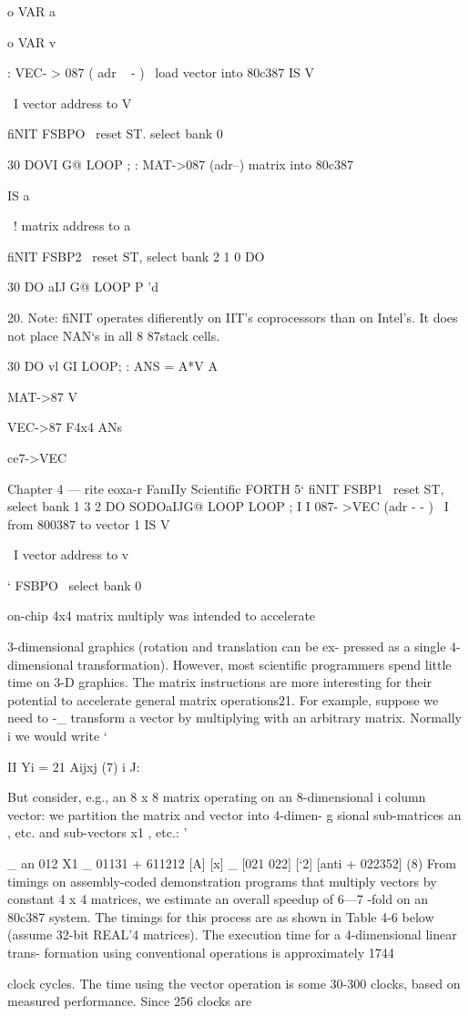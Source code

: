 {{{{{o VAR a{{ o VAR v{

: VEC- > 087 ( adr ~ - ) \ load vector into 80c387
IS V{ \ I vector address to V{
fiNIT FSBPO \ reset ST. select bank 0

30 DOV{I} G@ LOOP ;
: MAT->087 (adr--) \Ioad matrix into 80c387

IS a{{ \ ! matrix address to a{{
fiNIT FSBP2 \ reset ST, select bank 2
1 0 DO

30 DO a{{IJ}} G@ LOOP
P \cont'd

 

20. Note: fiNIT operates difierently on IIT’s coprocessors than on Intel’s. It does not place NAN‘s
in all 8 87stack cells.

30 DO v{l} GI LOOP;
\example: ANS = A*V
A{{ MAT->87 V{ VEC->87 F4x4 ANs{ce7->VEC

Chapter 4 — rite eoxa-r FamIIy Scientific FORTH 5‘
fiNIT FSBP1 \ reset ST, select bank 1
3 2 DO
SODOa{{IJ}}G@ LOOP
LOOP ; I
I
087- >VEC (adr - - ) \ I from 800387 to vector 1
IS V{ \ I vector address to v{ ‘
FSBPO \ select bank 0 %

 

 on-chip 4x4 matrix multiply was intended to accelerate

3-dimensional graphics (rotation and translation can be ex-
pressed as a single 4-dimensional transformation). However, most
scientific programmers spend little time on 3-D graphics. The matrix
instructions are more interesting for their potential to accelerate
general matrix operations21. For example, suppose we need to -_
transform a vector by multiplying with an arbitrary matrix. Normally i
we would write ‘

   

II
Yi = 21 Aijxj (7) i
J:

But consider, e.g., an 8 x 8 matrix operating on an 8-dimensional i
column vector: we partition the matrix and vector into 4-dimen- g
sional sub-matrices an , etc. and sub-vectors x1 , etc.: '

_ an 012 X1 _ 01131 + 611212
[A] [x] _ [021 022] [‘2] [anti + 022352] (8)
From timings on assembly-coded demonstration programs that
multiply vectors by constant 4 x 4 matrices, we estimate an overall
speedup of 6—7 -fold on an 80c387 system. The timings for this
process are as shown in Table 4-6 below (assume 32-bit REAL'4
matrices). The execution time for a 4-dimensional linear trans-
formation using conventional operations is approximately 1744

clock cycles. The time using the vector operation is some 30-300
clocks, based on measured performance. Since 256 clocks are

}}}}}}}}}}}}}}}}}}}}
